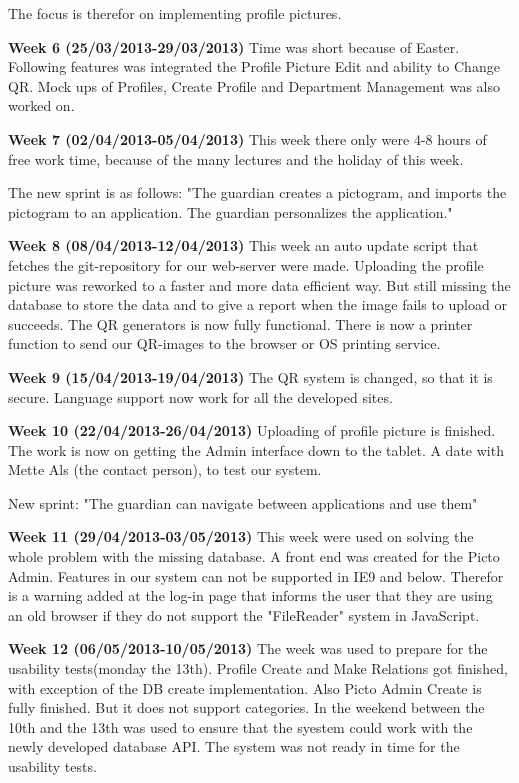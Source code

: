 The focus is therefor on implementing profile pictures. 

\textbf{Week 6 (25/03/2013-29/03/2013)}
Time was short because of Easter. 
Following features was integrated the Profile Picture Edit and ability to Change QR.
Mock ups of Profiles, Create Profile and Department Management was also worked on.    

\textbf{Week 7 (02/04/2013-05/04/2013)}
This week there only were 4-8 hours of free work time, because of the many lectures and the holiday of this week.

The new sprint is as follows: 
"The guardian creates a pictogram, and imports the pictogram to an application. The guardian personalizes the application."

\textbf{Week 8 (08/04/2013-12/04/2013)}
This week an auto update script that fetches the git-repository for our web-server were made.
Uploading the profile picture was reworked to a faster and more data efficient way. 
But still missing the database to store the data and to give a report when the image fails to upload or succeeds.
The QR generators is now fully functional. 
There is now a printer function to send our QR-images to the browser or OS printing service.

\textbf{Week 9 (15/04/2013-19/04/2013)}
The QR system is changed, so that it is secure. 
Language support now work for all the developed sites.

\textbf{Week 10 (22/04/2013-26/04/2013)}
Uploading of profile picture is finished.
The work is now on getting the Admin interface down to the tablet.
A date with Mette Als (the contact person), to test our system.

New sprint: 
"The guardian can navigate between applications and use them"

\textbf{Week 11 (29/04/2013-03/05/2013)}
This week were used on solving the whole problem with the missing database.
A front end was created for the Picto Admin. Features  in our system can not be supported in IE9 and below. Therefor is a warning added at the log-in page that informs the user that they are using an old browser if they do not support the "FileReader" system in JavaScript.

\textbf{Week 12 (06/05/2013-10/05/2013)}
The week was used to prepare for the usability tests(monday the 13th).
Profile Create and Make Relations got finished, with exception of the DB create implementation. 
Also Picto Admin Create is fully finished. But it does not support categories. 
In the weekend between the 10th and the 13th was used to ensure that the syestem could work with the newly developed database API. The system was not ready in time for the usability tests. 

